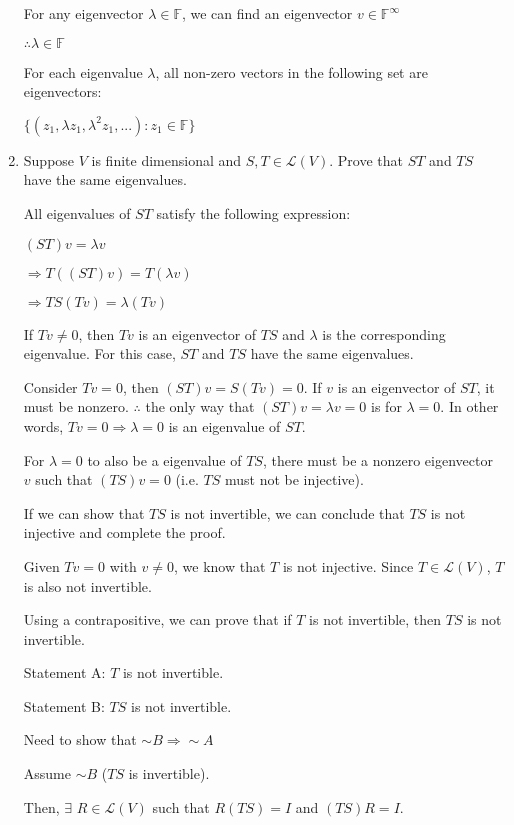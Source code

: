 \documentclass[fleqn]{article}
\begin{document}
\begin{enumerate}[nolistsep]
				For any eigenvector $\lambda \in \mathbb{F}$, we can find an eigenvector $v \in \mathbb{F}^\infty$
				 
				 $\therefore \lambda \in \mathbb{F}$
				 
				 For each eigenvalue $\lambda$, all non-zero vectors in the following set are eigenvectors:
				 
				 $\{(z_1,{\lambda}z_1,{\lambda}^2z_1, ...) : z_1 \in \mathbb{F}\}$
				 
			\item Suppose $V$ is finite dimensional and $S,T \in \mathcal{L}(V)$. Prove that $ST$ and $TS$ have the same eigenvalues.
			
			\pagebreak
			All eigenvalues of $ST$ satisfy the following expression:
			
			$(ST)v = {\lambda}v$
			
			$\Rightarrow T((ST)v) = T({\lambda}v)$
			
			$\Rightarrow TS(Tv) = \lambda(Tv)$
			
			If $Tv \neq 0$, then $Tv$ is an eigenvector of $TS$ and $\lambda$ is the corresponding eigenvalue. For this case, $ST$ and $TS$ have the same eigenvalues.
			
			Consider $Tv = 0$, then $(ST)v = S(Tv) = 0$. If $v$ is an eigenvector of $ST$, it must be nonzero. $\therefore$ the only way that $(ST)v = {\lambda}v = 0$ is for $\lambda = 0$. In other words, $Tv = 0 \Rightarrow \lambda = 0$ is an eigenvalue of $ST$.
			
			For $\lambda = 0$ to also be a eigenvalue of $TS$, there must be a nonzero eigenvector $v$ such that $(TS)v = 0$ (i.e. $TS$ must not be injective).
			
			If we can show that $TS$ is not invertible, we can conclude that $TS$ is not injective and complete the proof.
			
			Given $Tv = 0$ with $v \neq 0$, we know that $T$ is not injective. Since $T \in \mathcal{L}(V)$, $T$ is also not invertible. 
			
			Using a contrapositive, we can prove that if $T$ is not invertible, then $TS$ is not invertible.
			
			Statement A: $T$ is not invertible.
			
			Statement B: $TS$ is not invertible.
			
			Need to show that ${\sim}B \Rightarrow {\sim}A$
			
			Assume ${\sim}B$ ($TS$ is invertible).
			
			Then, $\exists$ $R \in \mathcal{L}(V)$ such that $R(TS) = I$ and $(TS)R = I$.
			

\end{enumerate}
\end{document}
